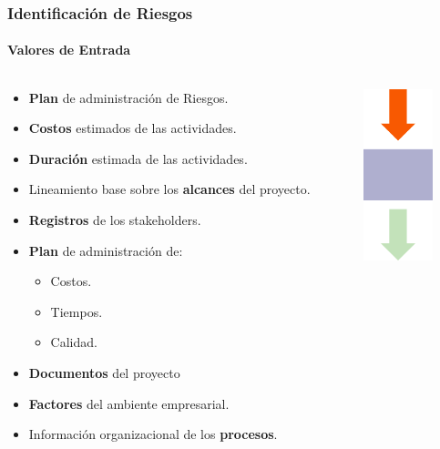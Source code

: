 \begin{frame}
\frametitle{Identificación de Riesgos}
\framesubtitle{Valores de Entrada}

\begin{columns}
	\begin{column}{0.8\textwidth}
\begin{itemize}
    \item<1-> \textbf{Plan} de administración de Riesgos.
    \item<2-> \textbf{Costos} estimados de las actividades.
    \item<3-> \textbf{Duración} estimada de las actividades.
    \item<4-> Lineamiento base sobre los \textbf{alcances} del proyecto.
    \item<5-> \textbf{Registros} de los stakeholders.
    \item<6-> \textbf{Plan} de administración de:
    \begin{itemize}
        \item Costos.
        \item Tiempos.
        \item Calidad.
    \end{itemize}
    \item<7-> \textbf{Documentos} del proyecto
    \item<8-> \textbf{Factores} del ambiente empresarial.
    \item<9-> Información organizacional de los \textbf{procesos}.
\end{itemize}
	\end{column}
	\begin{column}{0.2\textwidth}
		\includegraphics[width=2cm]{img/input}
	\end{column}
\end{columns}
\end{frame}


